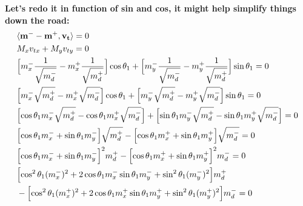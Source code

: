 \documentclass[12pt]{article}
\begin{document}
\textbf{Let's redo it in function of sin and cos, it might help simplify things down the road:}
\begin{align}
    &\langle \mathbf{m^-} - \mathbf{m^+}, \mathbf{v_t} \rangle = 0\\
    &M_x v_{tx} + M_yv_{ty} = 0\\
    &\Bigl[m_x^-\frac{1}{\sqrt{m_d^-}} - m_x^+\frac{1}{\sqrt{m_d^+}}\Bigr]\cos\theta_1 + \Bigl[ m_y^-\frac{1}{\sqrt{m_d^-}} - m_y^+\frac{1}{\sqrt{m_d^+}} \Bigr]\sin\theta_1 = 0\\
    &\Bigl[m_x^-\sqrt{m_d^+} - m_x^+\sqrt{m_d^-}\Bigr]\cos\theta_1 + \Bigl[ m_y^-\sqrt{m_d^+} - m_y^+\sqrt{m_d^-} \Bigr]\sin\theta_1 = 0\\
    &\Bigl[\cos\theta_1m_x^-\sqrt{m_d^+} - \cos\theta_1m_x^+\sqrt{m_d^-}\Bigr] + \Bigl[ \sin\theta_1m_y^-\sqrt{m_d^+} - \sin\theta_1m_y^+\sqrt{m_d^-} \Bigr] = 0\\
    &\Bigl[\cos\theta_1m_x^- + \sin\theta_1m_y^- \Bigr]\sqrt{m_d^+} - \Bigl[ \cos\theta_1m_x^+  + \sin\theta_1m_y^+ \Bigr]\sqrt{m_d^-} = 0\\
    &\Bigl[\cos\theta_1m_x^- + \sin\theta_1m_y^- \Bigr]^2 m_d^+ - \Bigl[ \cos\theta_1m_x^+  + \sin\theta_1m_y^+ \Bigr]^2 m_d^- = 0\\
    &\Bigl[\cos^2\theta_1(m_x^-)^2 + 2\cos\theta_1m_x^- \sin\theta_1m_y^-  + \sin^2\theta_1(m_y^-)^2 \Bigr] m_d^+ \nonumber\\
    &- \Bigl[ \cos^2\theta_1(m_x^+)^2  + 2\cos\theta_1m_x^+ \sin\theta_1m_y^+  +\sin^2\theta_1(m_y^+)^2 \Bigr] m_d^- = 0
\end{align}
\end{document}
